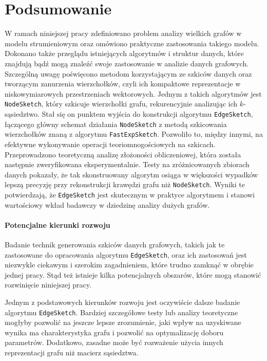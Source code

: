 \chapter*{Podsumowanie}
\label{chap:summary}

    W ramach niniejszej pracy zdefiniowano problem analizy wielkich grafów w modelu strumieniowym oraz omówiono praktyczne zastosowania takiego modelu. Dokonano także przeglądu istniejących algorytmów i struktur danych, które znajdują bądź mogą znaleźć swoje zastosowanie w analizie danych grafowych. Szczególną uwagę poświęcono metodom korzystającym ze szkiców danych oraz tworzącym zanurzenia wierzchołków, czyli ich kompaktowe reprezentacje w niskowymiarowych przestrzeniach wektorowych. Jednym z takich algorytmów jest \texttt{NodeSketch}, który szkicuje wierzchołki grafu, rekurencyjnie analizując ich $k$-sąsiedztwo. Stał się on punktem wyjścia do konstrukcji algorytmu \texttt{EdgeSketch}, łączącego główny schemat działania \texttt{NodeSketch} z metodą szkicowania wierzchołków znaną z algorytmu \texttt{FastExpSketch}. Pozwoliło to, między innymi, na efektywne wykonywanie operacji teoriomnogościowych na szkicach. Przeprowadzono teoretyczną analizę złożoności obliczeniowej, która została następnie zweryfikowana eksperymentalnie. Testy na zróżnicowanych zbiorach danych pokazały, że tak skonstruowany algorytm osiąga w większości wypadków lepszą precyzję przy rekonstrukcji krawędzi grafu niż \texttt{NodeSketch}. Wyniki te potwierdzają, że \texttt{EdgeSketch} jest skutecznym w praktyce algorytmem i stanowi wartościowy wkład badawczy w dziedzinę analizy dużych grafów.

\subsubsection*{Potencjalne kierunki rozwoju}
    Badanie technik generowania szkiców danych grafowych, takich jak te zastosowane do opracowania algorytmu \texttt{EdgeSketch}, oraz ich zastosowań jest niezwykle ciekawym i szerokim zagadnieniem, które trudno zamknąć w obrębie jednej pracy. Stąd też istnieje kilka potencjalnych obszarów, które mogą stanowić rozwinięcie niniejszej pracy. 
    
    Jednym z podstawowych kierunków rozwoju jest oczywiście dalsze badanie algorytmu \texttt{EdgeSketch}. Bardziej szczegółowe testy lub analizy teoretyczne mogłyby pozwolić na jeszcze lepsze zrozumienie, jaki wpływ na uzyskiwane wynika ma charakterystyka grafu i pozwolić na optymalizację doboru parametrów. Dodatkowo, zasadne może być rozważenie użycia innych reprezentacji grafu niż macierz sąsiedztwa.

